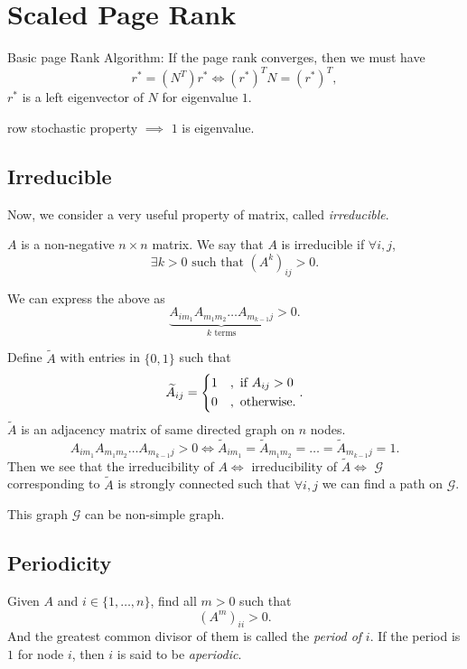 \section{Scaled Page Rank}
\begin{prev}
	Basic page Rank Algorithm: If the page rank converges, then we must have
	\[
		r^{*} = (N^{T})r^{*} \iff (r^{*})^{T} N = (r^{*})^{T},
	\]
	\(r^{*}\) is a left eigenvector of \(N\) for eigenvalue \(1\).
\end{prev}
\begin{remark}
	row stochastic property \(\implies\) \(1\) is eigenvalue.
\end{remark}

\subsection{Irreducible}
\par Now, we consider a very useful property of matrix, called \emph{irreducible}.
\begin{prev}
	\(A\) is a non-negative \(n\times n\) matrix. We say that \(A\) is irreducible if \(\forall i, j\),
	\[
		\exists k>0 \text{ such that }(A^k)_{ij} > 0.
	\]
\end{prev}
\begin{note}
	We can express the above as
	\[
		\underbrace{A_{im_1} A_{m_{1}m_2} \ldots A_{m_{k-1}j}}_{k\text{ terms}}>0.
	\]
\end{note}
Define \(\widetilde{A}\) with entries in \(\{0, 1\}\) such that
\[
	\widetilde{A}_{ij} = \begin{dcases}
		1 & , \text{ if }A_{ij}>0 \\
		0 & , \text{ otherwise}.
	\end{dcases}.
\]
\(\widetilde{A}\) is an adjacency matrix of same directed graph on \(n\) nodes.
\[
	A_{im_1} A_{m_1 m_2}\ldots A_{m_{k-1} j} > 0 \iff \widetilde{A}_{im_1} = \widetilde{A}_{m_1 m_2} = \ldots = \widetilde{A}_{m_{k-1}j} = 1.
\]
Then we see that the irreducibility of \(A \iff\) irreducibility of \(\widetilde{A}\iff\) \(\mathcal{G}\) corresponding to \(\widetilde{A}\) is strongly connected such that
\(\forall  i, j\) we can find a path on \(\mathcal{G}\).
\begin{remark}
	This graph \(\mathcal{G}\) can be non-simple graph.
\end{remark}

\subsection{Periodicity}
\begin{definition}
	Given \(A\) and \(i\in\{1, \ldots , n\}\), find all \(m>0\) such that
	\[
		(A^m)_{ii}>0.
	\]
	And the greatest common divisor of them is called the \emph{period of} \(i\). If the period is \(1\) for node \(i\), then
	\(i\) is said to be \emph{aperiodic}.
\end{definition}

